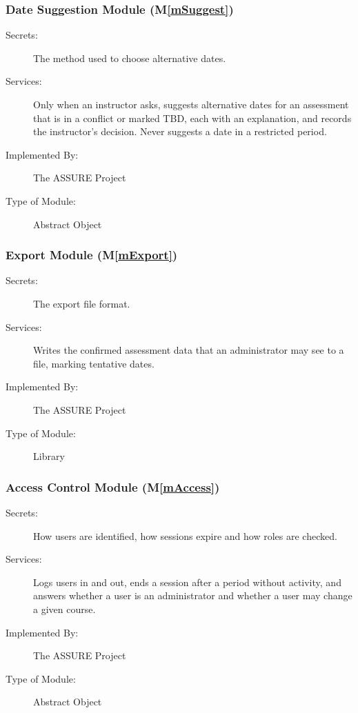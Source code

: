 \documentclass[12pt, titlepage]{article}
\newcommand{\sysname}{The ASSURE Project}
\newcommand{\mref}[1]{M\ref{#1}}
\begin{document}
\subsubsection{Date Suggestion Module (\mref{mSuggest})} \label{SecMD-mSuggest}

\begin{description}
\item[Secrets:] The method used to choose alternative dates.
\item[Services:] Only when an instructor asks, suggests alternative dates for an assessment that
is in a conflict or marked TBD, each with an explanation, and records the instructor’s
decision. Never suggests a date in a restricted period.
\item[Implemented By:] \sysname
\item[Type of Module:] Abstract Object
\end{description}

\subsubsection{Export Module (\mref{mExport})} \label{SecMD-mExport}

\begin{description}
\item[Secrets:] The export file format.
\item[Services:] Writes the confirmed assessment data that an administrator
  may see to a file, marking tentative dates.
\item[Implemented By:] \sysname
\item[Type of Module:] Library
\end{description}

\subsubsection{Access Control Module (\mref{mAccess})}

\begin{description}
\item[Secrets:] How users are identified, how sessions expire and how roles
  are checked.
\item[Services:] Logs users in and out, ends a session after a period without
  activity, and answers whether a user is an administrator and whether a user
  may change a given course.
\item[Implemented By:] \sysname
\item[Type of Module:] Abstract Object
\end{description}
\end{document}
